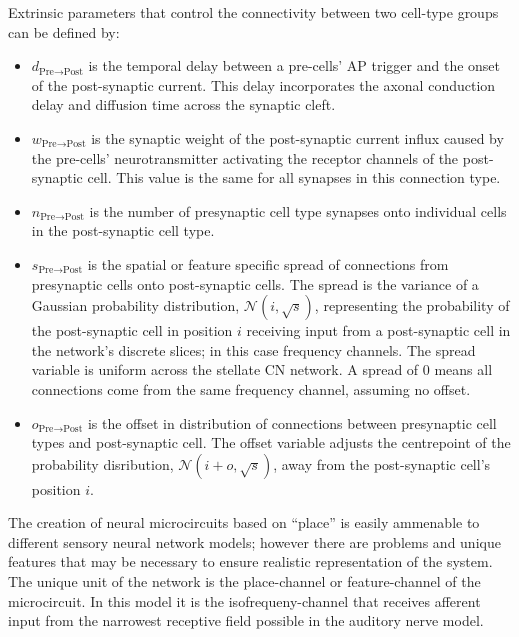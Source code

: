
Extrinsic parameters that control the connectivity between two cell-type groups can be defined by:
\begin{itemize}
\item $d_{\textrm{{Pre}}\to\textrm{{Post}}}\xspace$ is the temporal delay  between a pre-cells' AP trigger and the onset of the post-synaptic current.  
This  delay incorporates the axonal conduction delay and diffusion time across the  synaptic cleft.
\item $w_{\textrm{{Pre}}\to\textrm{{Post}}}\xspace$ is the synaptic weight of  the post-synaptic current influx caused by the pre-cells' neurotransmitter  activating the receptor channels of the post-synaptic cell.  
  This value is the  same for all synapses in this connection type.
\item $n_{\textrm{{Pre}}\to\textrm{{Post}}}\xspace$ is the number of presynaptic cell type synapses onto individual cells in the post-synaptic cell type.
\item $s_{\textrm{{Pre}}\to\textrm{{Post}}}\xspace$ is the spatial or feature  specific spread of connections from presynaptic cells onto post-synaptic  cells.  
  The spread is the variance of a Gaussian probability distribution,  $\mathcal{N}(i,\sqrt{s})$, representing the probability of the post-synaptic  cell in position $i$ receiving input from a post-synaptic cell in the  network's discrete slices; in this case frequency channels.  
  The spread   variable is uniform across the stellate CN network.  
  A spread of 0 means all  connections come from the same frequency channel, assuming no offset.
\item $o_{\textrm{{Pre}}\to\textrm{{Post}}}\xspace$ is the offset in  distribution of connections between presynaptic cell types and post-synaptic  cell. 
  The offset variable adjusts the centrepoint of the probability  disribution, $\mathcal{N}(i + o, \sqrt{s})$, away from the post-synaptic  cell's position $i$.
\end{itemize}


The creation of neural microcircuits based on ``place'' is easily ammenable to different sensory neural network models; however there are problems and unique features that may be necessary to ensure realistic representation of the system. 
The unique unit of the network is the place-channel or feature-channel of the microcircuit. 
In this model it is the isofrequeny-channel that receives afferent input from the narrowest receptive field possible in the auditory nerve model.

